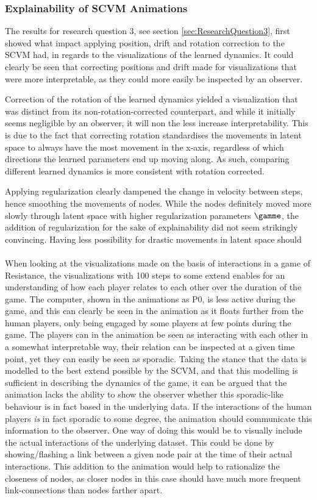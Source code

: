 \subsubsection{Explainability of SCVM Animations}
\label{sec:Discussion:Results:Explainability}
The results for research question 3, see section \ref{sec:ResearchQuestion3}, first showed what impact applying position, drift and rotation correction to the SCVM had, in regards to the visualizations of the learned dynamics.
It could clearly be seen that correcting positions and drift made for visualizations that were more interpretable, as they could more easily be inspected by an observer.

Correction of the rotation of the learned dynamics yielded a visualization that was distinct from its non-rotation-corrected counterpart, and while it initially seems negligible by an observer, it will non the less increase interpretability.
This is due to the fact that correcting rotation standardises the movements in latent space to always have the most movement in the x-axis, regardless of which directions the learned parameters end up moving along.
As such, comparing different learned dynamics is more consistent with rotation corrected.

Applying regularization clearly dampened the change in velocity between steps, hence smoothing the movements of nodes. 
While the nodes definitely moved more slowly through latent space with higher regularization parameters $\gamme$, the addition of regularization for the sake of explainability did not seem strikingly convincing.
Having less possibility for drastic movements in latent space should
\\\\
When looking at the visualizations made on the basis of interactions in a game of Resistance, the visualizations with 100 steps to some extend enables for an understanding of how each player relates to each other over the duration of the game. 
The computer, shown in the animations as P0, is less active during the game, and this can clearly be seen in the animation as it floats further from the human players, only being engaged by some players at few points during the game.
The players can in the animation be seen as interacting with each other in a somewhat interpretable way, their relation can be inspected at a given time point, yet they can easily be seen as sporadic.
Taking the stance that the data is modelled to the best extend possible by the SCVM, and that this modelling is sufficient in describing the dynamics of the game, it can be argued that the animation lacks the ability to show the observer whether this sporadic-like behaviour is in fact based in the underlying data.
If the interactions of the human players \textit{is} in fact sporadic to some degree, the animation should communicate this information to the observer.
One way of doing this would be to visually include the actual interactions of the underlying dataset.
This could be done by showing/flashing a link between a given node pair at the time of their actual interactions.
This addition to the animation would help to rationalize the closeness of nodes, as closer nodes in this case should have much more frequent link-connections than nodes farther apart.

